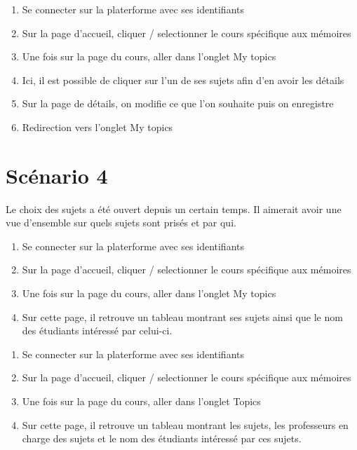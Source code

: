 \documentclass[a4paper, 11pt]{article}
\begin{document}
\begin{tcolorbox}
    \begin{enumerate}
        \item Se connecter sur la platerforme avec ses identifiants
        \item Sur la page d'accueil, cliquer / selectionner le cours spécifique aux mémoires
        \item Une fois sur la page du cours, aller dans l'onglet \og My topics\fg{}
        \item Ici, il est possible de cliquer sur l'un de ses sujets afin d'en avoir les détails
        \item Sur la page de détails, on modifie ce que l'on souhaite puis on enregistre
        \item Redirection vers l'onglet \og My topics\fg{}
    \end{enumerate}
\end{tcolorbox}



\section*{Scénario 4}
Le choix des sujets a été ouvert depuis un certain temps. Il aimerait avoir une vue d'ensemble sur quels sujets sont prisés et par qui.

\begin{tcolorbox}[title=Si le professeur souhaite voir l'état de ses sujets]
    \begin{enumerate}
        \item Se connecter sur la platerforme avec ses identifiants
        \item Sur la page d'accueil, cliquer / selectionner le cours spécifique aux mémoires
        \item Une fois sur la page du cours, aller dans l'onglet \og My topics\fg{}
        \item Sur cette page, il retrouve un tableau montrant ses sujets ainsi que le nom des étudiants intéressé par celui-ci.
    \end{enumerate}
\end{tcolorbox}

\begin{tcolorbox}[title=Si le professeur est le gérant du cours et souhaite voir l'avancement général des choses]
    \begin{enumerate}
        \item Se connecter sur la platerforme avec ses identifiants
        \item Sur la page d'accueil, cliquer / selectionner le cours spécifique aux mémoires
        \item Une fois sur la page du cours, aller dans l'onglet \og Topics\fg{}
        \item Sur cette page, il retrouve un tableau montrant les sujets, les professeurs en charge des sujets et le nom des étudiants intéressé par ces sujets.
    \end{enumerate}
\end{tcolorbox}
\end{document}
